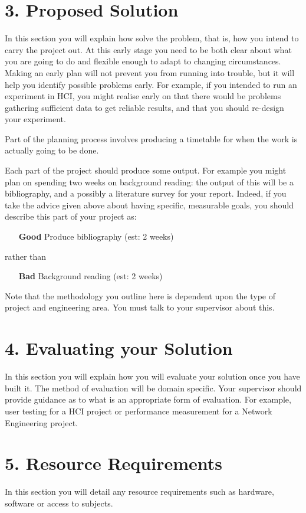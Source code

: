 \documentclass[11pt, a4paper, twoside, openright]{report}
\begin{document}
\section*{3. Proposed Solution}

In this section you will explain how solve the problem, that is, how
you intend to carry the project out. At this early stage you need to
be both clear about what you are going to do and flexible enough to
adapt to changing circumstances. Making an early plan will not prevent
you from running into trouble, but it will help you identify possible
problems early. For example, if you intended to run an experiment in
HCI, you might realise early on that there would be problems gathering
sufficient data to get reliable results, and that you should re-design
your experiment.

Part of the planning process involves producing a timetable for when
the work is actually going to be done.

Each part of the project should produce some output. For example you
might plan on spending two weeks on background reading: the output of
this will be a bibliography, and a possibly a literature survey for
your report. Indeed, if you take the advice given above about having
specific, measurable goals, you should describe this part of your
project as:

\begin{itemize}
\item[\bf Good] Produce bibliography (est: 2 weeks)
\end{itemize}
rather than
\begin{itemize}
\item[\bf Bad] Background reading (est: 2 weeks)
\end{itemize}

Note that the methodology you outline here is dependent upon the type
of project and engineering area. You must talk to your supervisor
about this.

\section*{4. Evaluating your Solution}

In this section you will explain how you will evaluate your solution
once you have built it. The method of evaluation will be domain
specific. Your supervisor should provide guidance as to what is an
appropriate form of evaluation. For example, user testing for a HCI
project or performance measurement for a Network Engineering project.

\section*{5. Resource Requirements}

In this section you will detail any resource requirements such as
hardware, software or access to subjects.

\backmatter

%


\end{document}
